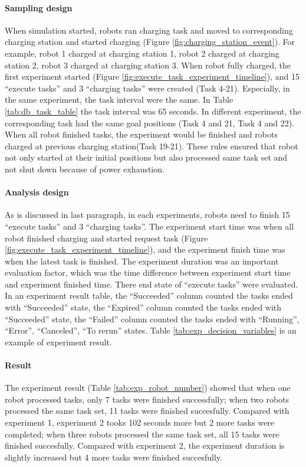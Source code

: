 \paragraph{Sampling design}
When simulation started, robots ran charging task and moved to corresponding charging station and started charging (Figure \ref{fig:charging_station_event}). For example, robot 1 charged at charging station 1, robot 2 charged at charging station 2, robot 3 charged at charging station 3. 
When robot fully charged, the first experiment started (Figure \ref{fig:execute_task_experiment_timeline}), and 15 ``execute tasks'' and 3 ``charging tasks'' were created (Task 4-21). Especially, in the same experiment, the task interval were the same. In Table \ref{tab:db_task_table} the task interval was 65 seconds. In different experiment, the corresponding task had the same goal positions (Task 4 and 21, Task 4 and 22). 
When all robot finished tasks, the experiment would be finished and robots charged at previous charging station(Task 19-21).
These rules ensured that robot not only started at their initial positions but also processed same task set and not shut down because of power exhaustion.


\paragraph{Analysis design}
As is discussed in last paragraph, in each experiments, robots need to finish 15 ``execute tasks'' and 3 ``charging tasks''.
The experiment start time was when all robot finished charging and started request task (Figure \ref{fig:execute_task_experiment_timeline}), and the experiment finish time was when the latest task is finished.
The experiment duration was an important evaluation factor, which was the time difference between experiment start time and experiment finished time.  
There end state of ``execute tasks'' were evaluated. In an experiment result table, the ``Succeeded'' column counted the tasks ended with ``Succeeded'' state, the ``Expired'' column counted the tasks ended with ``Succeeded'' state, the ``Failed'' column counted the tasks ended with ``Running'', ``Error'', ``Canceled'', ``To rerun'' states. 
Table \ref{tab:exp_decision_variables} is an example of experiment result. 

\paragraph{Result} The experiment result (Table \ref{tab:exp_robot_number}) showed that when one robot processed tasks, only 7 tasks were finished successfully; when two robots processed the same task set, 11 tasks were finished succesfully. Compared with experiment 1, experiment 2 tooks 102 seconds more but 2 more tasks were completed; when three robots processed the same task set, all 15 tasks were finished succesfully. Compared with experiment 2, the experiment duration is slightly increased but 4 more tasks were finished succesfully.

